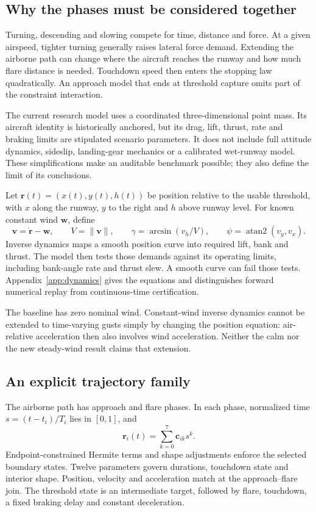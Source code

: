 \subsection{Why the phases must be considered together}
Turning, descending and slowing compete for time, distance and force. At a given airspeed, tighter turning generally raises lateral force demand. Extending the airborne path can change where the aircraft reaches the runway and how much flare distance is needed. Touchdown speed then enters the stopping law quadratically. An approach model that ends at threshold capture omits part of the constraint interaction.

The current research model uses a coordinated three-dimensional point mass. Its aircraft identity is historically anchored, but its drag, lift, thrust, rate and braking limits are stipulated scenario parameters. It does not include full attitude dynamics, sideslip, landing-gear mechanics or a calibrated wet-runway model. These simplifications make an auditable benchmark possible; they also define the limit of its conclusions.

Let $\mathbf r(t)=(x(t),y(t),h(t))$ be position relative to the usable threshold, with $x$ along the runway, $y$ to the right and $h$ above runway level. For known constant wind $\mathbf w$, define
\begin{equation}
\mathbf v=\dot{\mathbf r}-\mathbf w,\qquad V=\|\mathbf v\|,\qquad
\gamma=\arcsin(v_h/V),\qquad \psi=\operatorname{atan2}(v_y,v_x).
\end{equation}
Inverse dynamics maps a smooth position curve into required lift, bank and thrust. The model then tests those demands against its operating limits, including bank-angle rate and thrust slew. A smooth curve can fail those tests. Appendix~\ref{app:dynamics} gives the equations and distinguishes forward numerical replay from continuous-time certification.

The baseline has zero nominal wind. Constant-wind inverse dynamics cannot be extended to time-varying gusts simply by changing the position equation: air-relative acceleration then also involves wind acceleration. Neither the calm nor the new steady-wind result claims that extension.

\subsection{An explicit trajectory family}
The airborne path has approach and flare phases. In each phase, normalized time $s=(t-t_i)/T_i$ lies in $[0,1]$, and
\begin{equation}
\mathbf r_i(t)=\sum_{k=0}^{7}\mathbf c_{ik}s^k.
\label{eq:poly}
\end{equation}
Endpoint-constrained Hermite terms and shape adjustments enforce the selected boundary states. Twelve parameters govern durations, touchdown state and interior shape. Position, velocity and acceleration match at the approach--flare join. The threshold state is an intermediate target, followed by flare, touchdown, a fixed braking delay and constant deceleration.

